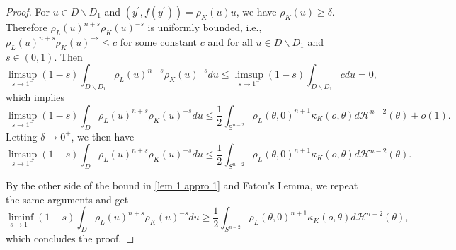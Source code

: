 \documentclass[10pt,a4paper]{amsart}
\newcommand{\tH}{\mathcal{H}}
\begin{document}
\begin{proof}
    For $u\in D\backslash D_1$ and $(y^{\prime},f(y^{\prime}))=\rho_K(u)u$, we have $\rho_K(u)\ge \delta $. Therefore $\rho_L(u)^{n+s}\rho_K(u)^{-s}$ is uniformly bounded, i.e., $\rho_L(u)^{n+s}\rho_K(u)^{-s}\leq c$ for some constant $c$ and for all $u\in D\backslash D_1$ and $s\in(0,1)$. Then
    \[\limsup_{s\rightarrow 1^{-}}(1-s)\int_{D\backslash D_1}\rho_L(u)^{n+s}\rho_K(u)^{-s}du\leq \limsup_{s\rightarrow 1^{-}}(1-s)\int_{D\backslash D_1} c du=0,\]
    which implies
    \[\limsup_{s\rightarrow 1^-}(1-s)\int_D\rho_L(u)^{n+s}\rho_K(u)^{-s}du\leq \frac{1}{2}\int_{\mathbb S^{n-2}}\rho_L(\theta,0)^{n+1}\kappa_K(o,\theta)d\tH^{n-2}(\theta)
    +o(1).\]
    Letting $\delta\rightarrow 0^+$, we then have
    \[\limsup_{s\rightarrow 1^-}(1-s)\int_D\rho_L(u)^{n+s}\rho_K(u)^{-s}du\leq \frac{1}{2}\int_{S^{n-2}}\rho_L(\theta,0)^{n+1}\kappa_K(o,\theta)d\tH^{n-2}(\theta).\]

    By the other side of the bound in \eqref{lem 1 appro 1} and Fatou's Lemma, we repeat the same arguments and get
    \[\liminf_{s\rightarrow 1^-}(1-s)\int_D\rho_L(u)^{n+s}\rho_K(u)^{-s}du\geq \frac{1}{2}\int_{S^{n-2}}\rho_L(\theta,0)^{n+1}\kappa_K(o,\theta)d\tH^{n-2}(\theta),\]
    which concludes the proof.
\end{proof}
\end{document}
